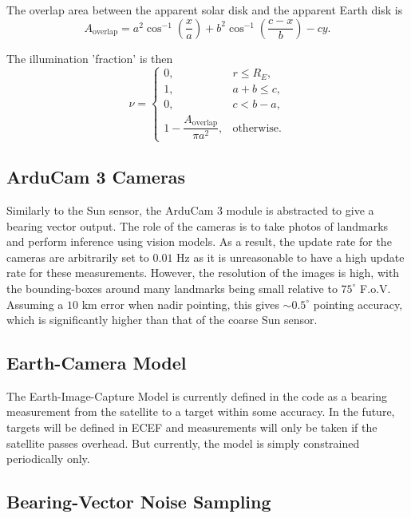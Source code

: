 \documentclass[conference,onecolumn,draftclsnofoot]{IEEEtran}
\begin{document}
The overlap area between the apparent solar disk and the apparent Earth disk is
\begin{equation}
A_{\mathrm{overlap}}
=
a^2\cos^{-1}\left(\frac{x}{a}\right)
+
b^2\cos^{-1}\left(\frac{c-x}{b}\right)
-
cy.
\end{equation}

The illumination 'fraction' is then
\begin{equation}
\nu =
\begin{cases}
0,
&
r \le R_E,\\[6pt]
1,
&
a+b \le c,\\[6pt]
0,
&
c < b-a,\\[6pt]
1-
\dfrac{A_{\mathrm{overlap}}}{\pi a^2},
&
\text{otherwise}.
\end{cases}
\end{equation}

\subsection{ArduCam 3 Cameras}

Similarly to the Sun sensor, the ArduCam 3 module is abstracted to give a bearing vector output. The role of the cameras is to take photos of landmarks and perform inference using vision models. As a result, the update rate for the cameras are arbitrarily set to $0.01$ Hz as it is unreasonable to have a high update rate for these measurements. However, the resolution of the images is high, with the bounding-boxes around many landmarks being small relative to $75^{\circ}$ F.o.V. Assuming a $10$ km error when nadir pointing, this gives $\sim0.5^{\circ}$ pointing accuracy, which is significantly higher than that of the coarse Sun sensor.

\subsection{Earth-Camera Model}

The Earth-Image-Capture Model is currently defined in the code as a bearing measurement from the satellite to a target within some accuracy. In the future, targets will be defined in ECEF and measurements will only be taken if the satellite passes overhead. But currently, the model is simply constrained periodically only.

\subsection{Bearing-Vector Noise Sampling}\label{sec:bearing-noise}
\end{document}
